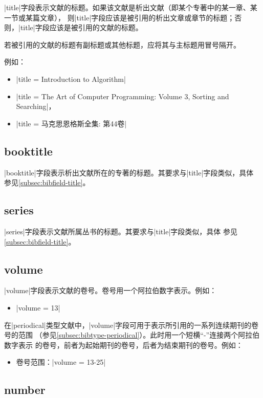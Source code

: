 |title|字段表示文献的标题。如果该文献是析出文献（即某个专著中的某一章、某一节或某篇文章），
则|title|字段应该是被引用的析出文章或章节的标题；否则，|title|字段应该是被引用的文献的标题。

若被引用的文献的标题有副标题或其他标题，应将其与主标题用冒号隔开。

例如：
\begin{itemize}
\item |title = {Introduction to Algorithm}|
\item |title = {The Art of Computer Programming: Volume 3, Sorting and Searching}|，
\item |title = {马克思恩格斯全集: 第44卷}|
\end{itemize}

\subsection{booktitle}\label{subsec:bibfield-booktitle}

|booktitle|字段表示析出文献所在的专著的标题。其要求与|title|字段类似，具体
参见\ref{subsec:bibfield-title}。

\subsection{series}\label{subsec:bibfield-series}

|series|字段表示文献所属丛书的标题。其要求与|title|字段类似，具体
参见\ref{subsec:bibfield-title}。

\subsection{volume}\label{subsec:bibfield-volume}

|volume|字段表示文献的卷号。卷号用一个阿拉伯数字表示。例如：
\begin{itemize}
\item |volume = {13}|
\end{itemize}

在|periodical|类型文献中，|volume|字段可用于表示所引用的一系列连续期刊的卷号的范围
（参见\ref{subsec:bibtype-periodical}）。此时用一个短横``-''连接两个阿拉伯数字表示
的卷号，前者为起始期刊的卷号，后者为结束期刊的卷号。例如：
\begin{itemize}
\item 卷号范围：|volume = {13-25}|
\end{itemize}

\subsection{number}\label{subsec:bibfield-number}

